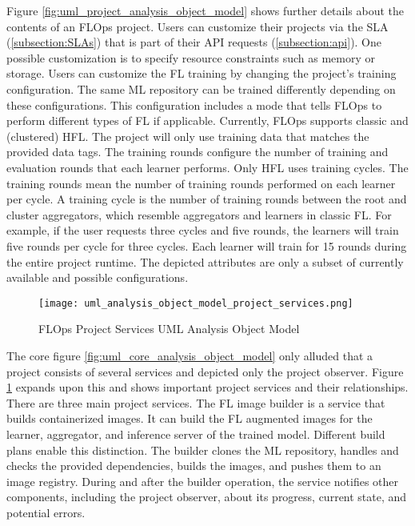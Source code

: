 Figure \ref{fig:uml_project_analysis_object_model} shows further details about the contents of an FLOps project.
Users can customize their projects via the SLA (\ref{subsection:SLAs}) that is part of their API requests (\ref{subsection:api}).
One possible customization is to specify resource constraints such as memory or storage.
Users can customize the FL training by changing the project's training configuration.
The same ML repository can be trained differently depending on these configurations.
This configuration includes a mode that tells FLOps to perform different types of FL if applicable.
Currently, FLOps supports classic and (clustered) HFL.
The project will only use training data that matches the provided data tags.
The training rounds configure the number of training and evaluation rounds that each learner performs.
Only HFL uses training cycles.
The training rounds mean the number of training rounds performed on each learner per cycle.
A training cycle is the number of training rounds between the root and cluster aggregators, which resemble aggregators and learners in classic FL.
For example, if the user requests three cycles and five rounds, the learners will train five rounds per cycle for three cycles.
Each learner will train for 15 rounds during the entire project runtime.
The depicted attributes are only a subset of currently available and possible configurations.

\begin{figure}[t]
    \begin{adjustwidth}{-0.1\paperwidth}{-0.1\paperwidth}
        \centering
        \texttt{[image: uml\_analysis\_object\_model\_project\_services.png]}
        \caption{FLOps Project Services UML Analysis Object Model}
        \label{fig:uml_project_services_analysis_object_model}
    \end{adjustwidth}
\end{figure}

The core figure \ref{fig:uml_core_analysis_object_model} only alluded that a project consists of several services and depicted only the project observer.
Figure \ref{fig:uml_project_services_analysis_object_model} expands upon this and shows important project services and their relationships.
There are three main project services.
The FL image builder is a service that builds containerized images.
It can build the FL augmented images for the learner, aggregator, and inference server of the trained model.
Different build plans enable this distinction.
The builder clones the ML repository, handles and checks the provided dependencies, builds the images, and pushes them to an image registry.
During and after the builder operation, the service notifies other components, including the project observer, about its progress, current state, and potential errors.

